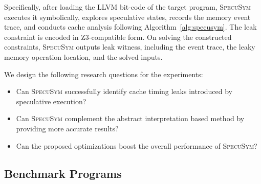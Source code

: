 \documentclass[sigconf,screen]{acmart}
\newcommand{\SpecuSym}{\textsc{SpecuSym} }
\begin{document}
Specifically, after loading the LLVM bit-code of the target program, \SpecuSym 
executes it symbolically, explores speculative states, records the memory 
event trace, and conducts cache analysis following Algorithm~\ref{alg:specusym}. 
The leak constraint is encoded in Z3-compatible form. On solving the constructed 
constraints, \SpecuSym outputs leak witness, including the event trace, the leaky 
memory operation location, and the solved inputs. 


We design the following research questions for the experiments: 
\begin{itemize}
\item Can \SpecuSym successfully identify cache timing leaks introduced 
by speculative execution?
\item Can \SpecuSym complement the abstract interpretation based method 
by providing more accurate results?
\item Can the proposed optimizations boost the overall performance of \textsc{SpecuSym}?
\end{itemize}


\subsection{Benchmark Programs}
\label{sec:benchs}
\end{document}
